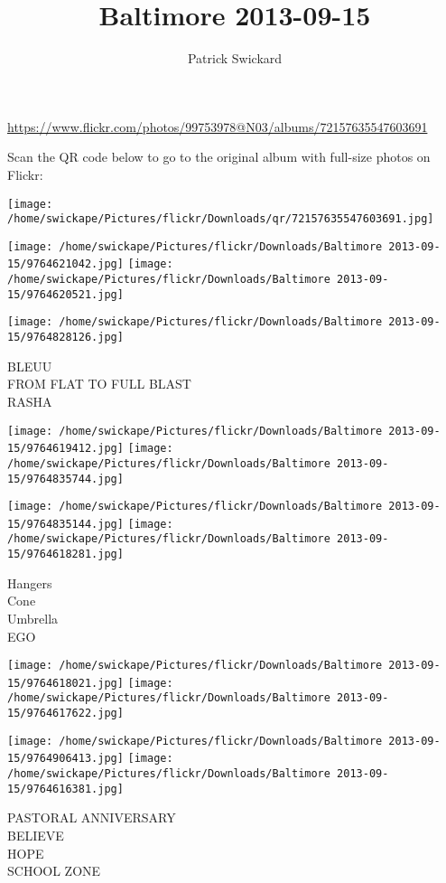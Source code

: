 \documentclass[10pt,letterpaper]{article}
\title{Baltimore 2013-09-15}
\author{Patrick Swickard}
\date{}
\begin{document}
\maketitle

\url{https://www.flickr.com/photos/99753978@N03/albums/72157635547603691}

Scan the QR code below to go to the original album with full-size photos on Flickr:

\texttt{[image: /home/swickape/Pictures/flickr/Downloads/qr/72157635547603691.jpg]}
\pagebreak

\texttt{[image: /home/swickape/Pictures/flickr/Downloads/Baltimore 2013-09-15/9764621042.jpg]}
\texttt{[image: /home/swickape/Pictures/flickr/Downloads/Baltimore 2013-09-15/9764620521.jpg]}

\vspace{0.25in}
\texttt{[image: /home/swickape/Pictures/flickr/Downloads/Baltimore 2013-09-15/9764828126.jpg]}

BLEUU\\
FROM FLAT TO FULL BLAST\\
RASHA
\pagebreak

\texttt{[image: /home/swickape/Pictures/flickr/Downloads/Baltimore 2013-09-15/9764619412.jpg]}
\texttt{[image: /home/swickape/Pictures/flickr/Downloads/Baltimore 2013-09-15/9764835744.jpg]}

\texttt{[image: /home/swickape/Pictures/flickr/Downloads/Baltimore 2013-09-15/9764835144.jpg]}
\texttt{[image: /home/swickape/Pictures/flickr/Downloads/Baltimore 2013-09-15/9764618281.jpg]}

Hangers\\
Cone\\
Umbrella\\
EGO
\pagebreak

\texttt{[image: /home/swickape/Pictures/flickr/Downloads/Baltimore 2013-09-15/9764618021.jpg]}
\texttt{[image: /home/swickape/Pictures/flickr/Downloads/Baltimore 2013-09-15/9764617622.jpg]}

\texttt{[image: /home/swickape/Pictures/flickr/Downloads/Baltimore 2013-09-15/9764906413.jpg]}
\texttt{[image: /home/swickape/Pictures/flickr/Downloads/Baltimore 2013-09-15/9764616381.jpg]}

PASTORAL ANNIVERSARY\\
BELIEVE\\
HOPE\\
SCHOOL ZONE
\pagebreak
\end{document}

